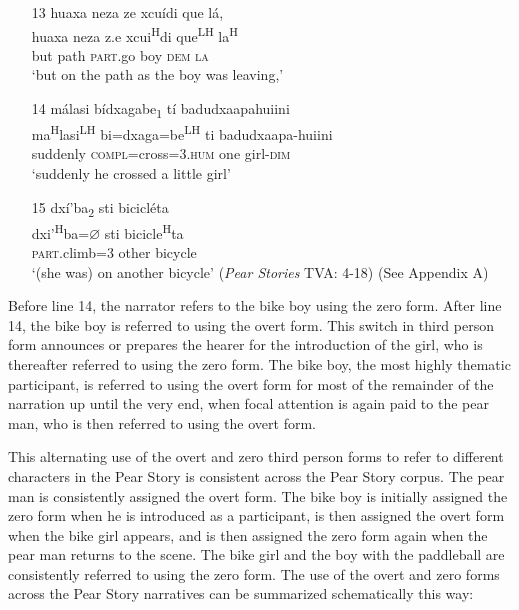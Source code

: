 \begin{itemize}
\item[13]
\glll huaxa neza ze xcu\'{i}di que l\'{a}, \\
huaxa neza z.e xcui\textsuperscript{H}di que\textsuperscript{LH} la\textsuperscript{H} \\
but path \textsc{part}.go boy \textsc{dem} \textsc{la} \\
\glt `but on the path as the boy was leaving,'


\item[14]
\glll m\'{a}lasi b\'{i}dxagabe\textsubscript{1} t\'{i} badudxaapahuiini \\
ma\textsuperscript{H}lasi\textsuperscript{LH} bi=dxaga=be\textsuperscript{LH}  ti badudxaapa-huiini \\
suddenly \textsc{compl}=cross=\textsc{3.hum} one girl-\textsc{dim} \\
\glt `suddenly he crossed a little girl'


\item[15]
\glll dx\'{i}'ba\textsubscript{2} sti bicicl\'{e}ta \\
dxi'\textsuperscript{H}ba={$\varnothing$} sti bicicle\textsuperscript{H}ta \\
\textsc{part}.climb=\textsc{3} other bicycle \\
\glt `(she was) on another bicycle' \hfill{(\textit{Pear Stories} TVA: 4-18) (See Appendix A)}

\end{itemize}
\z

Before line 14, the narrator refers to the bike boy using the zero form. After line 14, the bike boy is referred to using the overt form. This switch in third person form announces or prepares the hearer for the introduction of the girl, who is thereafter referred to using the zero form. The bike boy, the most highly thematic participant, is referred to using the overt form for most of the remainder of the narration up until the very end, when focal attention is again paid to the pear man, who is then referred to using the overt form.

This alternating use of the overt and zero third person forms to refer to different characters in the Pear Story is consistent across the Pear Story corpus. The pear man is consistently assigned the overt form. The bike boy is initially assigned the zero form when he is introduced as a participant, is then assigned the overt form when the bike girl appears, and is then assigned the zero form again when the pear man returns to the scene. The bike girl and the boy with the paddleball are consistently referred to using the zero form. The use of the overt and zero forms across the Pear Story narratives can be summarized schematically this way:


